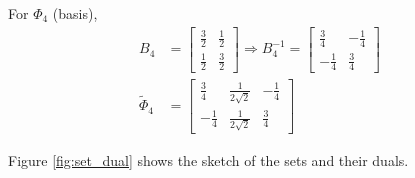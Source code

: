 \begin{enumerate}[(a)]
For $\Phi_4$ (basis),
\begin{align*}
	B_4 &= \begin{bmatrix}
	\frac{3}{2} & \frac{1}{2} \\
	\frac{1}{2} & \frac{3}{2}
	\end{bmatrix} \Rightarrow B_4^{-1} = \begin{bmatrix}
	\frac{3}{4} & -\frac{1}{4} \\
	-\frac{1}{4} & \frac{3}{4}
	\end{bmatrix} \\
	\tilde{\Phi}_4 &= \begin{bmatrix}
	\frac{3}{4} & \frac{1}{2\sqrt{2}} & -\frac{1}{4} \\
	-\frac{1}{4} & \frac{1}{2\sqrt{2}} & \frac{3}{4}
	\end{bmatrix}
\end{align*}

Figure \ref{fig:set_dual} shows the sketch of the sets and their duals.


\end{enumerate}
